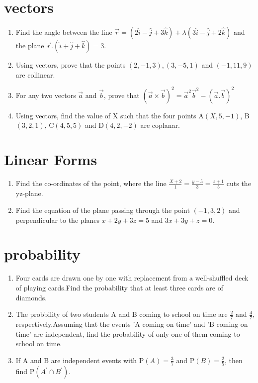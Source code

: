 \documentclass{article}
\providecommand{\brak}[1]{\ensuremath{\left(#1\right)}}
\begin{document}
\section{vectors}
\begin{enumerate}	
\item Find the angle between the line $\overrightarrow{r} = \brak{2\hat{i}-\hat{j}+3\hat{k}} + \lambda\brak{3\hat{i}-\hat{j}+2\hat{k}}$ and the  plane $\overrightarrow{r}.\brak{\hat{i}+\hat{j}+\hat{k}}=3$.	
\item Using vectors, prove that the points $\brak{2, -1, 3}, \brak{3, -5, 1}$ and $\brak{-1, 11, 9}$ are collinear.
\item For any two vectors $\overrightarrow{a}$ and $\overrightarrow{b}$, prove that $\brak{\overrightarrow{a} \times \overrightarrow{b}}^{2}=\overrightarrow{a}^{2}\overrightarrow{b}^{2}-\brak{\overrightarrow{a} . \overrightarrow{b}}^{2}$
\item Using vectors, find the value of X such that the four points A$\brak{X, 5, -1}$, B$\brak{3, 2, 1}$, C$\brak{4, 5, 5}$ and D$\brak{4, 2, -2}$ are coplanar.
\end{enumerate}
\section{Linear Forms}
\begin{enumerate}
\item Find the co-ordinates of the point, where the line ${\frac {X+2}{1}}={\frac{y-5}{3}}={\frac{z+1}{5}}$ cuts the yz-plane.
\item Find the equation of the plane passing through the point $\brak{-1, 3, 2}$ and perpendicular to the planes $x+2y+3z=5$ and $3x+3y+z=0$.
\end{enumerate}
\section{probability}
\begin{enumerate}
\item Four cards are drawn one by one with replacement from a well-shuffled deck of playing cards.Find the probability that at least three cards are of diamonds.
\item The probbility of two students A and B coming to school on time are $\frac{2}{7}$ and $\frac{4}{7}$, respectively.Assuming that the events 'A coming on time' and 'B coming on time' are independent, find the probability of only one of them coming to school on time.
\item If A and B are independent events with P$\brak{A}=\frac{3}{7}$ and P$\brak{B}=\frac{2}{5}$, then find P$\brak{A^{\prime} \cap B^{\prime}}$.
\end{enumerate}
\end{document}
